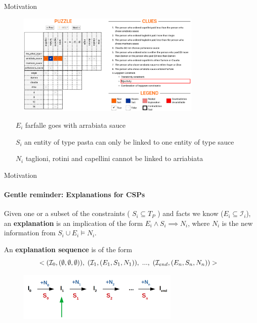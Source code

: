 \documentclass[handout]{beamer}
\begin{document}
	\begin{frame}{Motivation}
		\begin{figure}
			\includegraphics[width=0.8\textwidth]{logic_puzzles_bij.png}
		\end{figure}\pause
		\begin{itemize}
			\item[$E_i$] farfalle goes with arrabiata sauce \pause
			\item[$S_i$] an entity of type pasta can only be linked to one entity of type sauce\pause
			\item[$N_i$] taglioni, rotini and capellini cannot be linked to arriabiata
		\end{itemize}
		
	\end{frame}
	
	\newcommand\onestep{\ensuremath{\call{explain-One-Step}}\xspace}
	
		\begin{frame}{Motivation}
		\framesubtitle{Gentle reminder: Explanations for CSPs}
		\begin{definition}
			Given one or a subset of the constraints ( $S_i \subseteq T_P$  ) and facts we know ($E_i\subseteq \mathcal{I}_i$), an \textbf{explanation} is an implication of the form $E_i \wedge S_i  \implies N_i $, where $N_i$ is the new information from $S_i \cup E_i \models N_i$. \cite{bogaerts2020step}
		\end{definition} 
		
		An \textbf{explanation sequence} is of the form $$<(\mathcal{I}_0,(\emptyset,\emptyset,\emptyset)),\text{\hspace{3pt}}(\mathcal{I}_1,(E_1, S_1, N_1)),\text{\hspace{3pt}}...,\text{\hspace{3pt}}(\mathcal{I}_{end},(E_{n}, S_n, N_n ))>$$
		
		\begin{figure}
			\includegraphics[width=0.7\textwidth]{sequence_explanation2.png}
		\end{figure}
		
	\end{frame}
	
\end{document}
